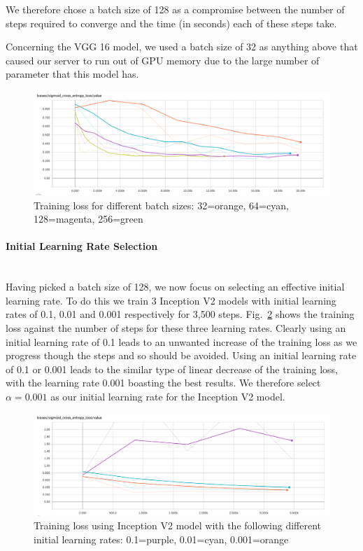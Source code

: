 \documentclass[12pt,twoside]{article}
\newcommand{\para}[1]{\paragraph{#1}\mbox{}\\}
\begin{document}
We therefore chose a batch size of 128 as a compromise between the number of
steps required to converge and the time (in seconds) each of these steps take.

Concerning the VGG 16 model, we used a batch size of 32 as anything above that
caused our server to run out of GPU memory due to the large number of parameter
that this model has.

\begin{figure}[ht]
  \centering
  \includegraphics[scale=0.2]{figures/batch_size_11au.png}
  \caption{Training loss for different batch sizes: 32=orange, 64=cyan,
  128=magenta, 256=green}
  \label{fig:batch_size_11au}
\end{figure}


\para{Initial Learning Rate Selection}

Having picked a batch size of 128, we now focus on selecting an effective
initial learning rate. To do this we train 3 Inception V2 models with initial
learning rates of 0.1, 0.01 and 0.001 respectively for 3,500 steps.
Fig.~\ref{fig:learning_rate_au11_inception} shows the training loss against the
number of steps for these three learning rates. Clearly using an initial
learning rate of 0.1 leads to an unwanted increase of the training loss as we
progress though the steps and so should be avoided. Using an initial learning
rate of 0.1 or 0.001 leads to the similar type of linear decrease of the training loss,
with the learning rate 0.001 boasting the best results. We therefore select
$\alpha=0.001$ as our initial learning rate for the Inception V2 model.


\begin{figure}[ht]
  \centering
  \includegraphics[scale=0.2]{figures/learning_rate_au11_inception.png}
  \caption{Training loss using Inception V2 model with the following different
    initial learning rates: 0.1=purple, 0.01=cyan,
  0.001=orange}
  \label{fig:learning_rate_au11_inception}
\end{figure}
\end{document}
